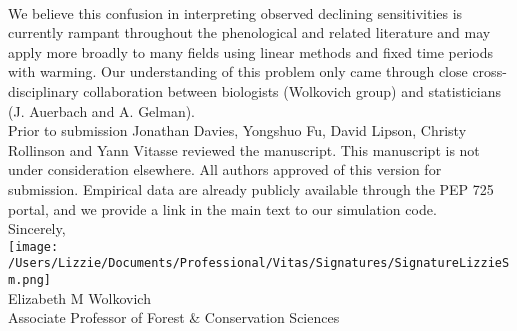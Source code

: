 \documentclass[11pt,a4paper]{article}
\begin{document}
\vspace{1.5ex}\\
We believe this confusion in interpreting observed declining sensitivities is currently rampant throughout the phenological \citep[e.g.,][]{fu2015,Samplonius:2018aa,vitasse2018,meng2020} and related literature \citep[e.g.,][]{piao2017} and may apply more broadly to many fields using linear methods and fixed time periods with warming. Our understanding of this problem only came through close cross-disciplinary collaboration between biologists (Wolkovich group) and statisticians (J. Auerbach and A. Gelman). 
\vspace{1.5ex}\\
Prior to submission Jonathan Davies, Yongshuo Fu, David Lipson, Christy Rollinson and Yann Vitasse reviewed the manuscript. This manuscript is not under consideration elsewhere. All authors approved of this version for submission. Empirical data are already publicly available through the PEP 725 portal, and we provide a link in the main text to our simulation code. %
\vspace{1.5ex}\\
Sincerely,\\

\texttt{[image: /Users/Lizzie/Documents/Professional/Vitas/Signatures/SignatureLizzieSm.png]} \\

\noindent Elizabeth M Wolkovich\\
Associate Professor of Forest \& Conservation Sciences\\ 


\end{document}
